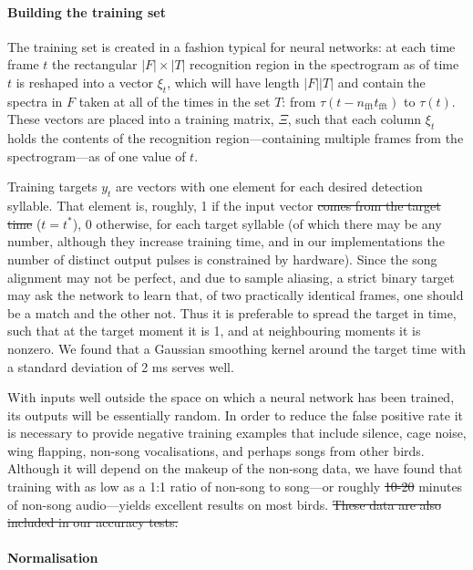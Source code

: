 \documentclass[10pt,letterpaper]{article}
\renewcommand{\subsubsection}[1]{\paragraph{#1}}
\providecommand{\DIFaddtex}[1]{{\protect\color{blue}\uwave{#1}}} %
\providecommand{\DIFdeltex}[1]{{\protect\color{red}\sout{#1}}}                      %
\providecommand{\DIFaddbegin}{} %
\providecommand{\DIFaddend}{} %
\providecommand{\DIFdelbegin}{} %
\providecommand{\DIFdelend}{} %
\providecommand{\DIFadd}[1]{\texorpdfstring{\DIFaddtex{#1}}{#1}} %
\providecommand{\DIFdel}[1]{\texorpdfstring{\DIFdeltex{#1}}{}} %
\begin{document}
\subsubsection{Building the training set}

The training set is created in a fashion typical for neural networks:
at each time frame $t$ the rectangular $|F|\times |T|$ recognition
region in the spectrogram as of time $t$ is reshaped into a vector
$\xi_t$, which will have length $|F||T|$ and contain the spectra in
$F$ taken at all of the times in the set $T$: from
$\tau(t-n_\textrm{fft}t_\textrm{fft})$ to $\tau(t)$.  These vectors
are placed into a training matrix, $\Xi$, such that each column
$\xi_t$ holds the contents of the recognition region---containing
multiple frames from the spectrogram---as of one value of $t$.

Training targets $y_t$ are vectors with one element for each desired
detection syllable.  That element is, roughly, 1 if the input vector
\DIFdelbegin \DIFdel{comes from the target time }\DIFdelend \DIFaddbegin \DIFadd{matches the target syllable }\DIFaddend ($t=t^*$), 0 otherwise, for each target
syllable (of which there may be any number, although they increase
training time, and in our implementations the number of distinct
output pulses is constrained by hardware).  Since the song alignment
may not be perfect, and due to sample aliasing, a
strict binary target may ask the network to learn that, of two
practically identical frames, one should be a match and the other
not. Thus it is preferable to spread the target in time, such that at
the target moment it is 1, and at neighbouring moments it is
nonzero. We found that a Gaussian smoothing kernel around the target
time with a standard deviation of 2 ms serves well.

With inputs well outside the space on which a neural network has been
trained, its outputs will be essentially random. In order to reduce
the false positive rate it is necessary to provide negative training
examples that include silence, cage noise, wing flapping, non-song
vocalisations, and perhaps songs from other birds.  Although it will
depend on the makeup of the non-song data, we have found that training
with as low as a 1:1 ratio of non-song to song---or roughly \DIFdelbegin \DIFdel{10-20
}\DIFdelend \DIFaddbegin \DIFadd{10
}\DIFaddend minutes of non-song audio---yields excellent results on most birds.
\DIFdelbegin \DIFdel{These data are also included in our accuracy tests.
}\DIFdelend 


\subsubsection{Normalisation}
\end{document}
